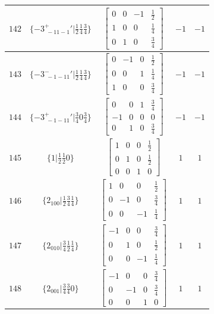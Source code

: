 \documentclass[fleqn,8pt]{jsarticle}
\begin{document}
\begin{longtable}{ccccc}
$ 142 $ & $ \{-3^{+}_{\,\,-11-1}{}'|\frac{1}{2} \frac{1}{4} \frac{3}{4}\} $ & $ \begin{bmatrix} 0 & 0 & -1 & \frac{1}{2} \\ 1 & 0 & 0 & \frac{1}{4} \\ 0 & 1 & 0 & \frac{3}{4} \end{bmatrix} $ & $ -1 $ & $ -1 $ \\ \hline
$ 143 $ & $ \{-3^{-}_{\,\,-1-11}{}'|\frac{1}{2} \frac{1}{4} \frac{3}{4}\} $ & $ \begin{bmatrix} 0 & -1 & 0 & \frac{1}{2} \\ 0 & 0 & 1 & \frac{1}{4} \\ 1 & 0 & 0 & \frac{3}{4} \end{bmatrix} $ & $ -1 $ & $ -1 $ \\ \hline
$ 144 $ & $ \{-3^{+}_{\,\,-1-11}{}'|\frac{3}{4} 0 \frac{3}{4}\} $ & $ \begin{bmatrix} 0 & 0 & 1 & \frac{3}{4} \\ -1 & 0 & 0 & 0 \\ 0 & 1 & 0 & \frac{3}{4} \end{bmatrix} $ & $ -1 $ & $ -1 $ \\ \hline
$ 145 $ & $ \{1|\frac{1}{2} \frac{1}{2} 0\} $ & $ \begin{bmatrix} 1 & 0 & 0 & \frac{1}{2} \\ 0 & 1 & 0 & \frac{1}{2} \\ 0 & 0 & 1 & 0 \end{bmatrix} $ & $ 1 $ & $ 1 $ \\ \hline
$ 146 $ & $ \{2{}_{100}|\frac{1}{2} \frac{3}{4} \frac{1}{4}\} $ & $ \begin{bmatrix} 1 & 0 & 0 & \frac{1}{2} \\ 0 & -1 & 0 & \frac{3}{4} \\ 0 & 0 & -1 & \frac{1}{4} \end{bmatrix} $ & $ 1 $ & $ 1 $ \\ \hline
$ 147 $ & $ \{2{}_{010}|\frac{3}{4} \frac{1}{2} \frac{1}{4}\} $ & $ \begin{bmatrix} -1 & 0 & 0 & \frac{3}{4} \\ 0 & 1 & 0 & \frac{1}{2} \\ 0 & 0 & -1 & \frac{1}{4} \end{bmatrix} $ & $ 1 $ & $ 1 $ \\ \hline
$ 148 $ & $ \{2{}_{001}|\frac{3}{4} \frac{3}{4} 0\} $ & $ \begin{bmatrix} -1 & 0 & 0 & \frac{3}{4} \\ 0 & -1 & 0 & \frac{3}{4} \\ 0 & 0 & 1 & 0 \end{bmatrix} $ & $ 1 $ & $ 1 $ \\ \hline

\end{longtable}
\end{document}
